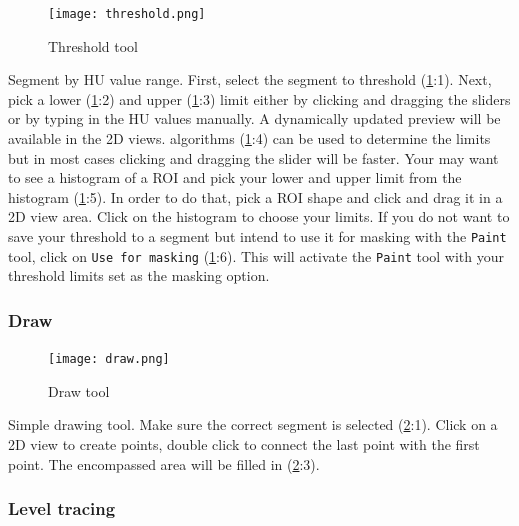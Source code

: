 \begin{figure}[h!]
	\centerline{
		\texttt{[image: threshold.png]}}
	\caption{Threshold tool}\label{fig:threshold}
\end{figure}
\noindent
Segment by HU value range.
First, select the segment to threshold (\cref{fig:threshold}:1).
Next, pick a lower (\cref{fig:threshold}:2) and upper (\cref{fig:threshold}:3) limit either by clicking and dragging the sliders or by typing in the HU values manually.
A dynamically updated preview will be available in the 2D views.
 algorithms (\cref{fig:threshold}:4) can be used to determine the limits but in most cases clicking and dragging the slider will be faster.
Your may want to see a histogram of a ROI and pick your lower and upper limit from the histogram (\cref{fig:threshold}:5).
In order to do that, pick a ROI shape and click and drag it in a 2D view area.
Click on the histogram to choose your limits.
If you do not want to save your threshold to a segment but intend to use it for masking with the \texttt{Paint} tool, click on \texttt{Use for masking} (\cref{fig:threshold}:6).
This will activate the \texttt{Paint} tool with your threshold limits set as the masking option.

\pagebreak
\subsubsection{Draw}\label{section:draw}
\begin{figure}[h]
	\begin{subfigure}{0.2\textwidth}
		
	\end{subfigure}
\end{figure}


\begin{figure}[h!]
	\centerline{
		\texttt{[image: draw.png]}}
	\caption{Draw tool}\label{fig:draw}
\end{figure}
\noindent
Simple drawing tool.
Make sure the correct segment is selected (\cref{fig:draw}:1).
Click on a 2D view to create points, double click to connect the last point with the first point.
The encompassed area will be filled in (\cref{fig:draw}:3).

\pagebreak
\subsubsection{Level tracing}
\begin{figure}[h]
	\begin{subfigure}{0.2\textwidth}
		
	\end{subfigure}
\end{figure}

